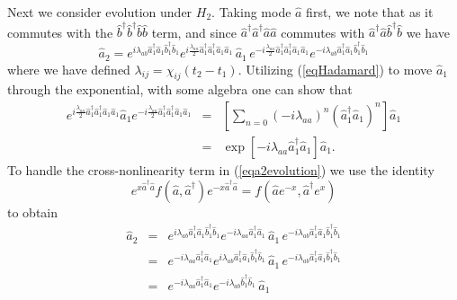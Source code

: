 \documentclass{iopart}
\begin{document}
Next we consider evolution under $H_2$. Taking mode $\hat{a}$ first, we note that as it commutes with the $\hat{b}^{\dagger} \hat{b}^{\dagger} \hat{b} \hat{b}$ term, and since $\hat{a}^{\dagger} \hat{a}^{\dagger} \hat{a} \hat{a}$ commutes with $\hat{a}^{\dagger} \hat{a} \hat{b}^{\dagger} \hat{b}$ we have
\begin{equation}
\hat{a}_2 = e^{i \lambda_{ab} \hat{a}_1^{\dagger} \hat{a}_1 \hat{b}_1^{\dagger} \hat{b}_1 } 
          e^{ i \frac{\lambda_{aa}} {2} \hat{a}_1^{\dagger} \hat{a}_1^{\dagger} \hat{a}_1 \hat{a}_1}\, \hat{a}_1 \,  
          e^{ -i \frac{\lambda_{aa}}{2} \hat{a}_1^{\dagger} \hat {a}_1^{\dagger} \hat{a}_1 \hat{a}_1 }
          e^{-i \lambda_{ab} \hat{a}_1^{\dagger} \hat{a}_1 \hat{b}_1^{\dagger} \hat{b}_1}
\label{eqa2evolution}
\end{equation}
where we have defined $\lambda_{ij} = \chi_{ij} (t_2-t_1)$. Utilizing (\ref{eqHadamard}) to move $\hat{a}_1$ through the exponential, with some algebra one can show that
\begin{eqnarray}
e^{ i \frac{\lambda_{aa}} {2} \hat{a}_1^{\dagger} \hat{a}_1^{\dagger} \hat{a}_1 \hat{a}_1} \hat{a}_1 
         e^{ -i \frac{\lambda_{aa}} {2} \hat{a}_1^{\dagger} \hat{a}_1^{\dagger} \hat{a}_1 \hat{a}_1} &=& \left[ \sum_{n=0} (-i \lambda_{aa})^n (\hat{a}_1^{\dagger} \hat{a}_1)^n \right] \hat{a}_1 \nonumber \nonumber \\
   &=& \exp[-i \lambda_{aa} \hat{a}_1^{\dagger} \hat{a}_1] \hat{a}_1.
\end{eqnarray}
To handle the cross-nonlinearity term in (\ref{eqa2evolution}) we use the identity \cite{louisell}
\begin{equation}
e^{x \hat{a}^{\dagger} \hat{a}} f(\hat{a}, \hat{a}^{\dagger}) e^{-x \hat{a}^{\dagger} \hat{a}} = f(\hat{a}e^{-x}, \hat{a}^{\dagger} e^{x})
\label{eqefeidentity}
\end{equation}
to obtain
\begin{eqnarray}
\hat{a}_2 &=& e^{i \lambda_{ab} \hat{a}_1^{\dagger} \hat{a}_1 \hat{b}_1^{\dagger} \hat{b}_1 } 
          e^{-i \lambda_{aa} \hat{a}_1^{\dagger} \hat{a}_1} \, \hat{a}_1 \,
          e^{-i \lambda_{ab} \hat{a}_1^{\dagger} \hat{a}_1 \hat{b}_1^{\dagger} \hat{b}_1} \nonumber \\
%
          &=& e^{-i \lambda_{aa} \hat{a}_1^{\dagger} \hat{a}_1} 
              e^{i \lambda_{ab} \hat{a}_1^{\dagger} \hat{a}_1 \hat{b}_1^{\dagger} \hat{b}_1 } \, \hat{a}_1 \,
          e^{-i \lambda_{ab} \hat{a}_1^{\dagger} \hat{a}_1 \hat{b}_1^{\dagger} \hat{b}_1} \nonumber \\
%
          &=& e^{-i \lambda_{aa} \hat{a}_1^{\dagger} \hat{a}_1} e^{-i \lambda_{ab} \hat{b}_1^{\dagger} \hat{b}_1} \, \hat{a}_1
\label{eqa2}
\end{eqnarray}
\end{document}
